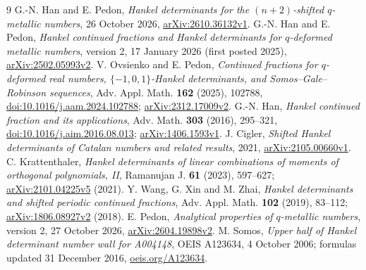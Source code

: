 \documentclass[11pt,a4paper]{article}
\begin{document}
\begin{thebibliography}{9}
 G.-N. Han and E. Pedon,
\emph{Hankel determinants for the $(n+2)$-shifted $q$-metallic numbers},
26 October 2026, \href{https://arxiv.org/abs/2610.36132v1}{arXiv:2610.36132v1}.
 G.-N. Han and E. Pedon,
\emph{Hankel continued fractions and Hankel determinants for $q$-deformed
metallic numbers}, version 2, 17 January 2026 (first posted 2025),
\href{https://arxiv.org/abs/2502.05993v2}{arXiv:2502.05993v2}.
 V. Ovsienko and E. Pedon,
\emph{Continued fractions for $q$-deformed real numbers,
$\{-1,0,1\}$-Hankel determinants, and Somos--Gale--Robinson sequences},
Adv. Appl. Math. \textbf{162} (2025), 102788,
\href{https://doi.org/10.1016/j.aam.2024.102788}{doi:10.1016/j.aam.2024.102788};
\href{https://arxiv.org/abs/2312.17009v2}{arXiv:2312.17009v2}.
 G.-N. Han, \emph{Hankel continued fraction and its applications},
Adv. Math. \textbf{303} (2016), 295--321,
\href{https://doi.org/10.1016/j.aim.2016.08.013}{doi:10.1016/j.aim.2016.08.013};
\href{https://arxiv.org/abs/1406.1593v1}{arXiv:1406.1593v1}.
 J. Cigler,
\emph{Shifted Hankel determinants of Catalan numbers and related results},
2021, \href{https://arxiv.org/abs/2105.00660v1}{arXiv:2105.00660v1}.
 C. Krattenthaler,
\emph{Hankel determinants of linear combinations of moments of orthogonal
polynomials, II}, Ramanujan J. \textbf{61} (2023), 597--627;
\href{https://arxiv.org/abs/2101.04225v5}{arXiv:2101.04225v5} (2021).
 Y. Wang, G. Xin and M. Zhai,
\emph{Hankel determinants and shifted periodic continued fractions},
Adv. Appl. Math. \textbf{102} (2019), 83--112;
\href{https://arxiv.org/abs/1806.08927v2}{arXiv:1806.08927v2} (2018).
 E. Pedon, \emph{Analytical properties of $q$-metallic numbers},
version 2, 27 October 2026,
\href{https://arxiv.org/abs/2604.19898v2}{arXiv:2604.19898v2}.
 M. Somos, \emph{Upper half of Hankel determinant number wall
for A004148}, OEIS A123634, 4 October 2006; formulas updated
31 December 2016, \href{https://oeis.org/A123634}{oeis.org/A123634}.
\end{thebibliography}
\end{document}

